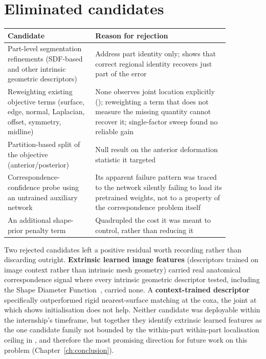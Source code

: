 \section{Eliminated candidates}
\label{sec:eliminated}

\begin{center}
\begin{tabular}{@{}p{0.34\linewidth}p{0.52\linewidth}@{}}
\toprule
\textbf{Candidate} & \textbf{Reason for rejection} \\
\midrule
Part-level segmentation refinements (SDF-based~\cite{sdf} and other
  intrinsic geometric descriptors) & Address part identity only;
  \F{F3} shows that correct regional identity recovers just part of the error \\
Reweighting existing objective terms (surface, edge, normal, Laplacian,
  offset, symmetry, midline) & None observes joint location explicitly
  (\F{F6}); reweighting a term that does not measure the missing quantity
  cannot recover it; single-factor sweep found no reliable gain \\
Partition-based split of the objective (anterior/posterior) & Null result on
  the anterior deformation statistic it targeted \\
Correspondence-confidence probe using an untrained auxiliary network & Its
  apparent failure pattern was traced to the network silently failing to
  load its pretrained weights, not to a property of the correspondence
  problem itself \\
An additional shape-prior penalty term & Quadrupled the cost it was meant to
  control, rather than reducing it \\
\bottomrule
\end{tabular}
\end{center}

Two rejected candidates left a positive residual worth recording rather than
discarding outright. \textbf{Extrinsic learned image features} (descriptors
trained on image context rather than intrinsic mesh geometry) carried real
anatomical correspondence signal where every intrinsic geometric descriptor
tested, including the Shape Diameter Function~\cite{sdf}, carried
none. A \textbf{context-trained descriptor} specifically outperformed rigid
nearest-surface matching at the coxa, the joint at which  shows
initialisation does not help. Neither candidate was deployable
within the internship's timeframe, but together they identify extrinsic
learned features as the one candidate family not bounded by the within-part
within-part localisation ceiling in , and therefore the most promising
direction for future work on this problem (Chapter~\ref{ch:conclusion}).
